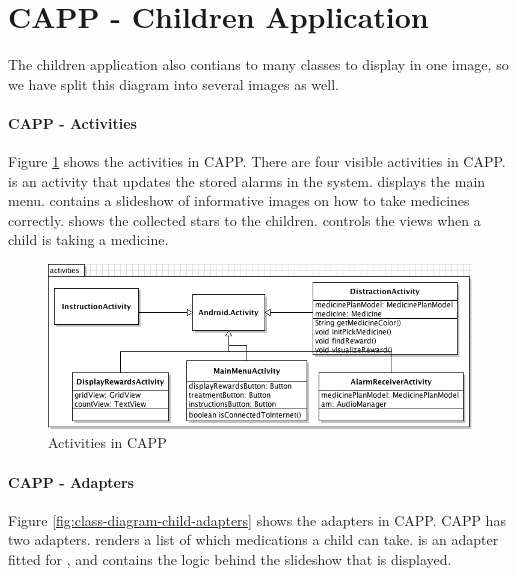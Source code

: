 \section{CAPP - Children Application}
The children application also contians to many classes to display in one image, so we have split
this diagram into several images as well.  

\paragraph{CAPP - Activities}
Figure \ref{fig:class-diagram-child-activities} shows the activities in CAPP.
There are four visible activities in CAPP.  is an activity that updates the stored alarms in the system. 
displays the main menu.  contains a slideshow of informative images on how to take medicines correctly. 
 shows the collected
stars to the children.  controls the views when a child is taking a medicine.
\begin{figure}[h!]
	\centering
		\includegraphics[width = \linewidth]{Pictures/ArchPictures/capparchpictures/capp_activities.png}
	\caption{Activities in CAPP}
	\label{fig:class-diagram-child-activities}
\end{figure}


\paragraph{CAPP - Adapters}
Figure \ref{fig:class-diagram-child-adapters} shows the adapters in CAPP.
CAPP has two adapters.  renders a list of which medications a child can take. 
 is an adapter fitted for , and contains the logic behind the slideshow that is displayed.


